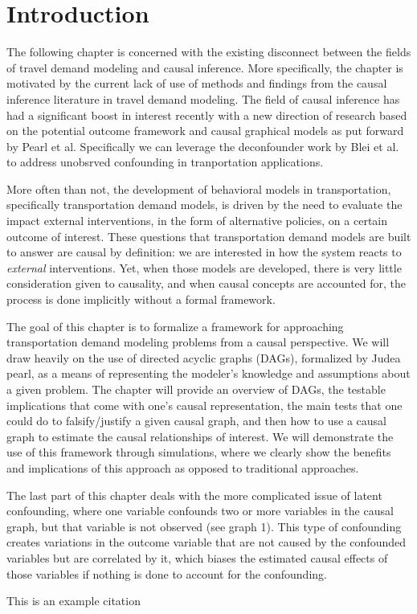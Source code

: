\section{Introduction}
The following chapter is concerned with the existing disconnect between the fields of travel demand modeling and causal inference. More specifically, the chapter is motivated by the current lack of use of methods and findings from the causal inference literature in travel demand modeling. The field of causal inference has had a significant boost in interest recently with a new direction of research based on the potential outcome framework and causal graphical models as put forward by Pearl et al. Specifically we can leverage the deconfounder work by Blei et al. to address unobsrved confounding in tranportation applications.

More often than not, the development of behavioral models in transportation, specifically transportation demand models, is driven by the need to evaluate the impact external interventions, in the form of alternative policies, on a certain outcome of interest. These questions that transportation demand models are built to answer are causal by definition: we are interested in how the system reacts to \textit{external} interventions. Yet, when those models are developed, there is very little consideration given to causality, and when causal concepts are accounted for, the process is done implicitly without a formal framework. 

The goal of this chapter is to formalize a framework for approaching transportation demand modeling problems from a causal perspective. We will draw heavily on the use of directed acyclic graphs (DAGs), formalized by Judea pearl, as a means of representing the modeler's knowledge and assumptions about a given problem. The chapter will provide an overview of DAGs, the testable implications that come with one's causal representation, the main tests that one could do to falsify/justify a given causal graph, and then how to use a causal graph to estimate the causal relationships of interest. We will demonstrate the use of this framework through simulations, where we clearly show the benefits and implications of this approach as opposed to traditional approaches. 

The last part of this chapter deals with the more complicated issue of latent confounding, where one variable confounds two or more variables in the causal graph, but that variable is not observed (see graph 1). This type of confounding creates variations in the outcome variable that are not caused by the confounded variables but are correlated by it, which biases the estimated causal effects of those variables if nothing is done to account for the confounding. 




\blindtext[2]

This is an example citation \cite{brathwaite_2018_causal}
